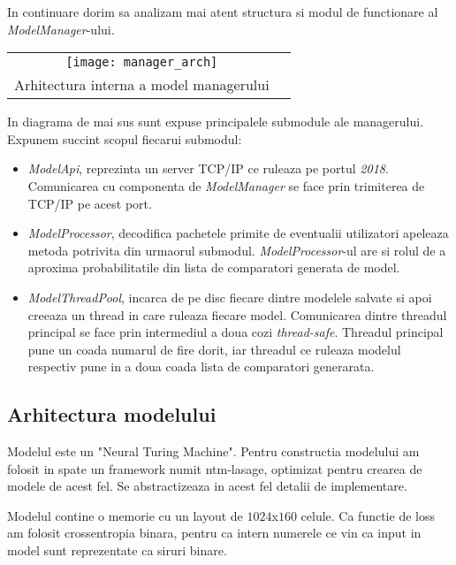 \documentclass[12pt]{article}
\begin{document}
\begin{itemize}
\end{itemize}



In continuare dorim sa analizam mai atent structura si modul de functionare al \textit{ModelManager}-ului.

\begin{center}
\begin{tabular}{cc}
\texttt{[image: manager\_arch]} \\
Arhitectura interna a model managerului
\end{tabular}
\end{center}


In diagrama de mai sus sunt expuse principalele submodule ale managerului. Expunem succint scopul fiecarui submodul:
\begin{itemize}
	\item \textit{ModelApi}, reprezinta un server TCP/IP ce ruleaza pe portul \textit{2018}. Comunicarea cu componenta de \textit{ModelManager} se face prin trimiterea de TCP/IP pe acest port.
	\item \textit{ModelProcessor}, decodifica pachetele primite de eventualii utilizatori apeleaza metoda potrivita din urmaorul submodul. \textit{ModelProcessor}-ul are si rolul de a aproxima probabilitatile din lista de comparatori generata de model.
	\item \textit{ModelThreadPool}, incarca de pe disc fiecare dintre modelele salvate si apoi creeaza un thread in care ruleaza fiecare model. Comunicarea dintre threadul principal se face prin intermediul a doua cozi \textit{thread-safe}. Threadul principal pune un coada numarul de fire dorit, iar threadul ce ruleaza modelul respectiv pune in a doua coada lista de comparatori generarata. 
\end{itemize}

\subsection{Arhitectura modelului}

Modelul este un "Neural Turing Machine". Pentru constructia modelului am folosit in spate un framework numit ntm-lasage, optimizat pentru crearea de modele de acest fel. Se abstractizeaza in acest fel detalii de implementare. 

Modelul contine o memorie cu un layout de $1024$x$160$ celule. Ca functie de loss am folosit crossentropia binara, pentru ca intern numerele ce vin ca input in model sunt reprezentate ca siruri binare.
\end{document}
